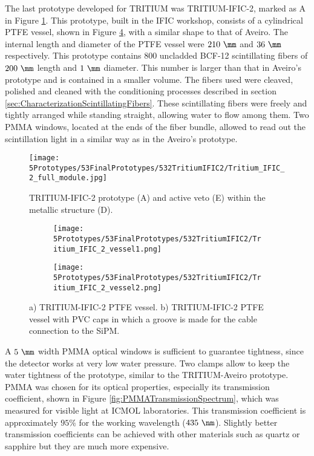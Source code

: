 The last prototype developed for TRITIUM was TRITIUM-IFIC-2, marked as A in Figure \ref{fig:TritiumIFIC2}. This prototype, built in the IFIC workshop, consists of a cylindrical PTFE vessel, shown in Figure \ref{fig:Tritium-IFIC2_vessels}, with a similar shape to that of Aveiro. The internal length and diameter of the PTFE vessel were $210~\mm$ and $36~\mm$ respectively. This prototype contains $800$ uncladded BCF-12 scintillating fibers of $200~\mm$ length and $1~\mm$ diameter. This number is larger than that in Aveiro's prototype and is contained in a smaller volume. The fibers used were cleaved, polished and cleaned with the conditioning processes described in section \ref{sec:CharacterizationScintillatingFibers}. These scintillating fibers were freely and tightly arranged while standing straight, allowing water to flow among them. Two PMMA windows, located at the ends of the fiber bundle, allowed to read out the scintillation light in a similar way as in the Aveiro's prototype. 

\begin{figure}[h]
\centering
\texttt{[image: 5Prototypes/53FinalPrototypes/532TritiumIFIC2/Tritium\_IFIC\_2\_full\_module.jpg]}
\caption{TRITIUM-IFIC-2 prototype (A) and active veto (E) within the metallic structure (D).\label{fig:TritiumIFIC2}}
\end{figure}

\begin{figure}
\centering
    \begin{subfigure}[b]{0.35\textwidth}
    \centering
    \texttt{[image: 5Prototypes/53FinalPrototypes/532TritiumIFIC2/Tritium\_IFIC\_2\_vessel1.png]}  
    \caption{\label{subfig:Tritium_IFIC_2_vessel}}
    \end{subfigure}
    \hfill
    \begin{subfigure}[b]{0.3\textwidth}
    \centering
    \texttt{[image: 5Prototypes/53FinalPrototypes/532TritiumIFIC2/Tritium\_IFIC\_2\_vessel2.png]}  
    \caption{\label{subfig:TritiumIFIC2_vessel_with_PVC_caps}}
    \end{subfigure}
 \caption{a) TRITIUM-IFIC-2 PTFE vessel. b) TRITIUM-IFIC-2 PTFE vessel with PVC caps in which a groove is made for the cable connection to the SiPM.}
 \label{fig:Tritium-IFIC2_vessels}
\end{figure}

A $5~\mm$ width PMMA optical windows is sufficient to guarantee tightness, since the detector works at very low water pressure. Two clamps allow to keep the water tightness of the prototype, similar to the TRITIUM-Aveiro prototype. PMMA was chosen for its optical properties, especially its transmission coefficient, shown in Figure \ref{fig:PMMATransmissionSpectrum}, which was measured for visible light at ICMOL laboratories. This transmission coefficient is approximately $95\%$ for the working wavelength ($435~\nm$). Slightly better transmission coefficients can be achieved with other materials such as quartz or sapphire but they are much more expensive.

